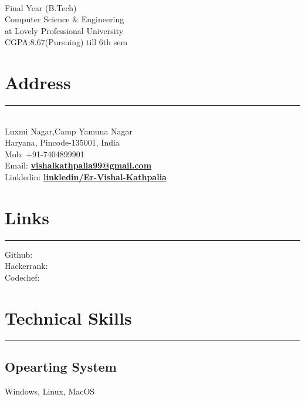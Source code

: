 \documentclass[]{vishal-kathpalia}
\begin{document}
%
%

\begin{minipage}[t]{0.33\textwidth} 
\begin{large}
	\\
\end{large}
Final Year (B.Tech)\\
Computer Science $\&$  Engineering\\ 
at Lovely Professional University \\ 
CGPA:8.67(Pursuing) till 6th sem 
\section{Address}
\noindent\rule{5cm}{0.4pt}
\\
Luxmi Nagar,Camp Yamuna Nagar \\
Haryana, Pincode-135001, India \\
Mob: +91-7404899901 \\
Email: \textbf{\href{mailto:vishalkathpalia99@gmail.com}{vishalkathpalia99@gmail.com}} \\
Linkledin: \textbf{\href{https://www.linkedin.com/in/vishal-kathpalia-ervk01}{linkledin/Er-Vishal-Kathpalia}} 
\sectionsep
\section{Links} 
\noindent\rule{5cm}{0.4pt}

Github: \href{https://github.com/Er-Vishal-Kathpalia}{}\\
Hackerrank: \href{https://www.hackerrank.com/er_kathpalia}{}\\
Codechef: \href{https://www.codechef.com/users/er_kathpalia}{}\\ 
\section{Technical Skills}
\noindent\rule{5cm}{0.4pt}
\subsection{Opearting System}
Windows, Linux, MacOS
\vspace{4pt}

\end{minipage}
\end{document}
